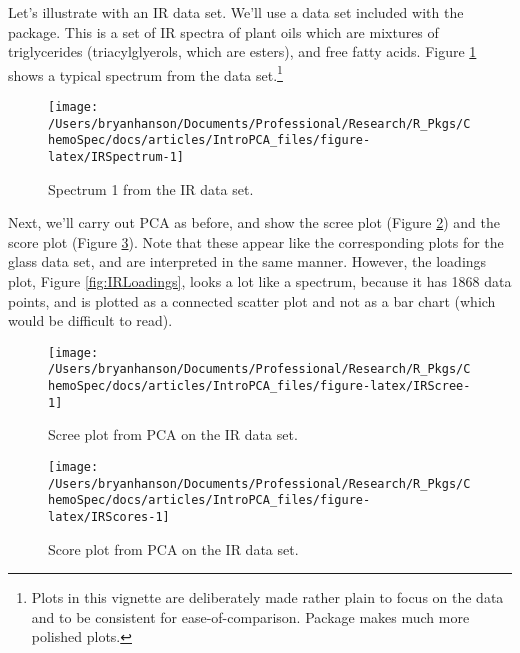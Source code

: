 \documentclass[10pt,twocolumn,twoside,]{pinp}
\begin{document}
Let's illustrate with an IR data set. We'll use a data set included with
the  package. This is a set of IR spectra of plant oils
which are mixtures of triglycerides (triacylglyerols, which are esters),
and free fatty acids. Figure \ref{fig:IRSpectrum} shows a typical
spectrum from the data
set.\footnote{Plots in this vignette are deliberately made rather plain to focus on the data and to be consistent for ease-of-comparison.  Package  makes much more polished plots.}

\begin{figure}

{\centering \texttt{[image: /Users/bryanhanson/Documents/Professional/Research/R\_Pkgs/ChemoSpec/docs/articles/IntroPCA\_files/figure-latex/IRSpectrum-1]} 

}

\caption{Spectrum 1 from the IR data set.\label{fig:IRSpecrum}}\label{fig:IRSpectrum}
\end{figure}

Next, we'll carry out PCA as before, and show the scree plot (Figure
\ref{fig:IRScree}) and the score plot (Figure \ref{fig:IRScores}). Note
that these appear like the corresponding plots for the glass data set,
and are interpreted in the same manner. However, the loadings plot,
Figure \ref{fig:IRLoadings}, looks a lot like a spectrum, because it has
1868 data points, and is plotted as a connected scatter plot and not as
a bar chart (which would be difficult to read).

\begin{figure}

{\centering \texttt{[image: /Users/bryanhanson/Documents/Professional/Research/R\_Pkgs/ChemoSpec/docs/articles/IntroPCA\_files/figure-latex/IRScree-1]} 

}

\caption{Scree plot from PCA on the IR data set.\label{fig:IRScree}}\label{fig:IRScree}
\end{figure}

\begin{figure}

{\centering \texttt{[image: /Users/bryanhanson/Documents/Professional/Research/R\_Pkgs/ChemoSpec/docs/articles/IntroPCA\_files/figure-latex/IRScores-1]} 

}

\caption{Score plot from PCA on the IR data set.\label{fig:IRScores}}\label{fig:IRScores}
\end{figure}
\end{document}
